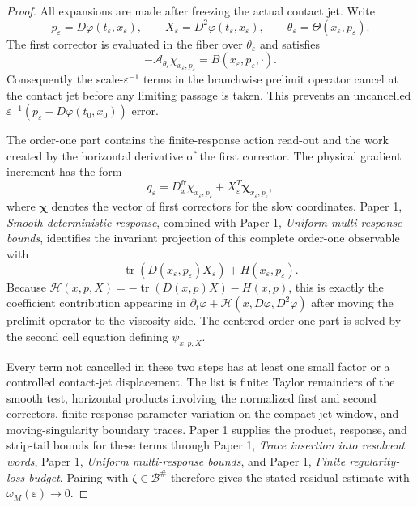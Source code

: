 \documentclass[11pt]{amsart}
\theoremstyle{definition}
\theoremstyle{remark}
\newcommand{\Hcal}{\mathcal H}
\newcommand{\Bcal}{\mathcal B}
\newcommand{\Acal}{\mathcal A}
\newcommand{\PaperOne}[2]{Paper 1, \emph{#1}}
\begin{document}
\begin{proof}
All expansions are made after freezing the actual contact jet.  Write
\[
  p_\varepsilon=D\varphi(t_\varepsilon,x_\varepsilon),\qquad
  X_\varepsilon=D^2\varphi(t_\varepsilon,x_\varepsilon),\qquad
  \theta_\varepsilon=\Theta(x_\varepsilon,p_\varepsilon).
\]
The first corrector is evaluated in the fiber over $\theta_\varepsilon$ and
satisfies
\[
  -\Acal_{\theta_\varepsilon}\chi_{x_\varepsilon,p_\varepsilon}
  =B(x_\varepsilon,p_\varepsilon,\cdot).
\]
Consequently the scale-$\varepsilon^{-1}$ terms in the branchwise prelimit
operator cancel at the contact jet before any limiting passage is taken.  This
prevents an uncancelled
$\varepsilon^{-1}(p_\varepsilon-D\varphi(t_0,x_0))$ error.

The order-one part contains the finite-response action read-out and the work
created by the horizontal derivative of the first corrector.  The physical
gradient increment has the form
\[
  q_\varepsilon
  =D_x^{\mathrm{fr}}\chi_{x_\varepsilon,p_\varepsilon}
   +X_\varepsilon^T\boldsymbol\chi_{x_\varepsilon,p_\varepsilon},
\]
where $\boldsymbol\chi$ denotes the vector of first correctors for the slow
coordinates.
\PaperOne{Smooth deterministic response}{thm:smooth_deterministic_response},
combined with
\PaperOne{Uniform multi-response bounds}{prop:uniform_multiresponse_bounds},
identifies the invariant projection of this complete order-one observable with
\[
  \operatorname{tr}(D(x_\varepsilon,p_\varepsilon)X_\varepsilon)
  +H(x_\varepsilon,p_\varepsilon).
\]
Because $\Hcal(x,p,X)=-\operatorname{tr}(D(x,p)X)-H(x,p)$, this is exactly the
coefficient contribution appearing in
$\partial_t\varphi+\Hcal(x,D\varphi,D^2\varphi)$ after moving the prelimit
operator to the viscosity side.  The centered order-one part is solved by the
second cell equation defining $\psi_{x,p,X}$.

Every term not cancelled in these two steps has at least one small factor or a
controlled contact-jet displacement.  The list is finite: Taylor remainders of
the smooth test, horizontal products involving the normalized first and second
correctors, finite-response parameter variation on the compact jet window, and
moving-singularity boundary traces.  Paper 1 supplies the product, response, and
strip-tail bounds for these terms through
\PaperOne{Trace insertion into resolvent words}{lem:trace_resolvent_insertion},
\PaperOne{Uniform multi-response bounds}{prop:uniform_multiresponse_bounds},
and \PaperOne{Finite regularity-loss budget}{thm:regularity_loss_budget}.
Pairing with $\zeta\in\Bcal^\#$ therefore gives the stated residual estimate
with $\omega_M(\varepsilon)\to0$.
\end{proof}
\end{document}
